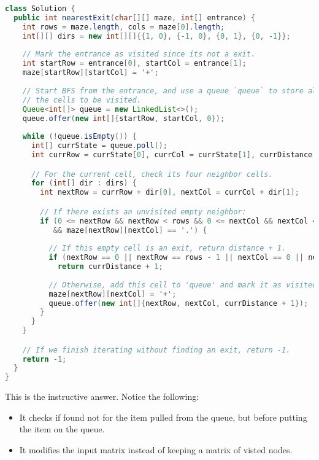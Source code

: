 \documentclass[12pt]{article}
\begin{document}
\begin{lstlisting}[language=Java]
class Solution {
  public int nearestExit(char[][] maze, int[] entrance) {
    int rows = maze.length, cols = maze[0].length;
    int[][] dirs = new int[][]{{1, 0}, {-1, 0}, {0, 1}, {0, -1}};
    
    // Mark the entrance as visited since its not a exit.
    int startRow = entrance[0], startCol = entrance[1];
    maze[startRow][startCol] = '+';
    
    // Start BFS from the entrance, and use a queue `queue` to store all 
    // the cells to be visited.
    Queue<int[]> queue = new LinkedList<>();
    queue.offer(new int[]{startRow, startCol, 0});
    
    while (!queue.isEmpty()) {
      int[] currState = queue.poll();
      int currRow = currState[0], currCol = currState[1], currDistance = currState[2];

      // For the current cell, check its four neighbor cells.
      for (int[] dir : dirs) {
        int nextRow = currRow + dir[0], nextCol = currCol + dir[1];

        // If there exists an unvisited empty neighbor:
        if (0 <= nextRow && nextRow < rows && 0 <= nextCol && nextCol < cols
           && maze[nextRow][nextCol] == '.') {
          
          // If this empty cell is an exit, return distance + 1.
          if (nextRow == 0 || nextRow == rows - 1 || nextCol == 0 || nextCol == cols - 1)
            return currDistance + 1;
          
          // Otherwise, add this cell to 'queue' and mark it as visited.
          maze[nextRow][nextCol] = '+';
          queue.offer(new int[]{nextRow, nextCol, currDistance + 1});
        }  
      }
    }

    // If we finish iterating without finding an exit, return -1.
    return -1;
  }
}
\end{lstlisting}

This is the instructive answer. Notice the following: 

\begin{itemize}
  \item It checks if found not for the item pulled from the queue, but before putting the item on the queue. 
  \item It modifies the input matrix instead of keeping a matrix of visted nodes.
\end{itemize}
\end{document}
